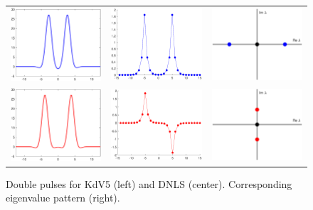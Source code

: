 \documentclass[12pt,reqno,oneside]{article}
\theoremstyle{definition}
\theoremstyle{remark}
\begin{document}
\begin{figure}
\centering
\begin{tabular}{ccc}
\includegraphics[width=4cm]{images/dp1.eps} &
\includegraphics[width=4cm]{images/dnls2unstable.eps} &
\includegraphics[width=4cm]{images/unstableeigpattern.eps} \\
\includegraphics[width=4cm]{images/dp2.eps} &
\includegraphics[width=4cm]{images/dnls2stable.eps} &
\includegraphics[width=4cm]{images/stableeigpattern.eps} 
\end{tabular}
\caption{Double pulses for KdV5 (left) and DNLS (center). Corresponding eigenvalue pattern (right).}
\label{fig:eigpatterns}
\end{figure}
\end{document}
